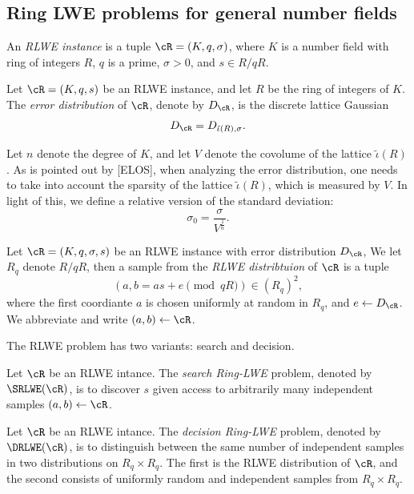 \documentclass{amsart}
\begin{document}
\subsection{Ring LWE problems for general number fields}

\begin{Definition}
An {\it RLWE instance} is a tuple $\cR = (K,q,\sigma)$, where $K$ is a number field with ring of integers $R$, $q$ is a prime, $\sigma >0$, and $s \in R/qR$.
\end{Definition}


\begin{Definition}
Let $\cR = (K,q,s)$ be an RLWE instance, and let $R$ be the ring of integers of $K$. The {\it error distribution} of $\cR$, denote by $D_\cR$, is the discrete lattice Gaussian
\[
D_\cR = D_{\tilde{\iota}(R),\sigma}.
\]
\end{Definition}

Let $n$ denote the degree of $K$, and let $V$ denote the covolume of the lattice $\tilde{\iota}(R)$. As is pointed out by [ELOS], when analyzing the error distribution, one needs to take into account the sparsity of the lattice $\tilde{\iota}(R)$, which is measured by $V$. In light of this, we define a relative version of the standard deviation: $$\sigma_0 = \frac{\sigma}{V^{\frac{1}{n}}}.$$

\begin{Definition}
Let $\cR = (K,q,\sigma, s)$ be an RLWE instance with error distribution $D_\cR$, We let $R_q$ denote $R/qR$, then
a sample from the {\it RLWE distribtuion} of $\cR$ is a tuple
$$(a, b = as+e\pmod{qR}) \in (R_q)^2, $$
where the first coordiante $a$ is chosen uniformly at random in $R_q$, and $e \gets D_\cR$. We abbreviate and write $(a,b) \gets \cR$.
\end{Definition}

The RLWE problem has two variants: search and decision.

\begin{Definition}[Search]
Let $\cR$ be an RLWE intance. The {\it search Ring-LWE} problem, denoted by $\SRLWE(\cR)$, is to discover $s$ given access to arbitrarily many independent samples $(a,b) \gets \cR$.
\end{Definition}

\begin{Definition}[Decision]
Let $\cR$ be an RLWE intance. The {\it decision Ring-LWE}
problem, denoted by $\DRLWE(\cR)$, is to distinguish between the same number of independent samples in two distributions on $R_q \times R_q$. The first is the RLWE distribution of $\cR$, and the second consists of uniformly random and independent samples from $R_q \times R_q$.
\end{Definition}
\end{document}
